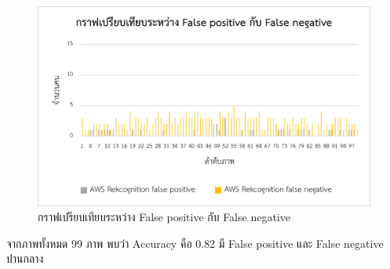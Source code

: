 \begin{figure}[ht]
    \centering
    \includegraphics[scale=1]{images/graph2_zone1-2.png}
    \caption[graph2-1]{กราฟเปรียบเทียบระหว่าง False positive กับ False negative}
    \label{fig:graph2-1}
\end{figure}
จากภาพทั้งหมด 99 ภาพ พบว่า Accuracy คือ 0.82 มี False positive และ False negative ปานกลาง

